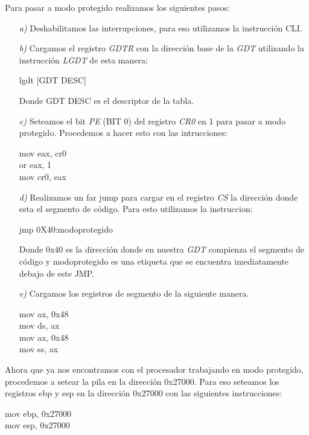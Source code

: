 Para pasar a modo protegido realizamos los siguientes pasos:

\begin{itemize}
\item [\textit{a)}] Deshabilitamos las interrupciones, para eso utilizamos la instrucción CLI.

\item [\textit{b)}] Cargamos el registro \textit{GDTR} con la dirección base de la \textit{\textit{GDT}} utilizando la instrucción \textit{LGDT} de esta manera: 
\begin{center}
lgdt [GDT DESC]
\end{center}
Donde GDT DESC es el descriptor de la tabla.

 \item [\textit{c)}] Seteamos el bit \textit{PE} (BIT 0) del registro \textit{CR0} en 1 para pasar a modo protegido. Procedemos a hacer esto con las intrucciones:
\begin{center}
      mov eax, cr0\\
     or eax, 1   $~~~~$ \\
       mov cr0, eax
    \end{center}

\item [\textit{d)}]Realizamos un far jump para cargar en el registro \textit{CS} la dirección donde esta el segmento de código. Para esto utilizamos la instruccion: 

\begin{center}
jmp 0X40:modoprotegido
\end{center}

Donde 0x40 es la dirección donde en nuestra \textit{GDT} compienza el segmento de código y modoprotegido es una etiqueta que se encuentra imediatamente debajo de este JMP. 

\item [\textit{e)}]Cargamos los registros de segmento de la siguiente manera.

\begin{center}
   mov ax, 0x48\\
    mov ds, ax$~~~$\\
    mov ax, 0x48\\
    mov ss, ax$~~~$\\
\end{center}


\end{itemize}

Ahora que ya nos encontramos con el procesador trabajando en modo protegido, procedemos a setear la pila en la dirección 0x27000. Para eso seteamos los registros ebp y esp en la dirección 0x27000 con las siguientes instrucciones: 
\begin{center}
mov ebp, 0x27000\\
mov esp, 0x27000\\
\end{center}

